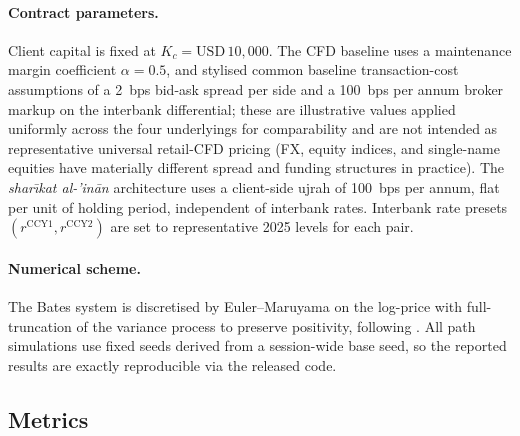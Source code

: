 \documentclass[preprint,12pt,authoryear]{elsarticle}
\theoremstyle{definition}
\begin{document}
\paragraph{Contract parameters.} Client capital is fixed at
$K_c = \text{USD}\,10{,}000$. The CFD baseline uses a maintenance
margin coefficient $\alpha = 0.5$, and stylised common baseline
transaction-cost assumptions of a 2~bps bid-ask spread per side
and a 100~bps per annum broker markup on the interbank
differential; these are illustrative values applied uniformly
across the four underlyings for comparability and are not intended
as representative universal retail-CFD pricing (FX, equity
indices, and single-name equities have materially different
spread and funding structures in practice). The
\emph{shar\={\i}kat al-'in\={a}n}
architecture uses a client-side ujrah of 100~bps per annum, flat
per unit of holding period, independent of interbank rates.
Interbank rate presets $(r^{\text{CCY1}}, r^{\text{CCY2}})$ are
set to representative 2025 levels for each pair.

\paragraph{Numerical scheme.} The Bates system is discretised by
Euler--Maruyama on the log-price with full-truncation of the
variance process to preserve positivity, following
\citet{Andersen2009}. All path simulations use fixed seeds derived
from a session-wide base seed, so the reported results are
exactly reproducible via the released code.

\subsection{Metrics}
\label{sec:sim-metrics}
\end{document}
